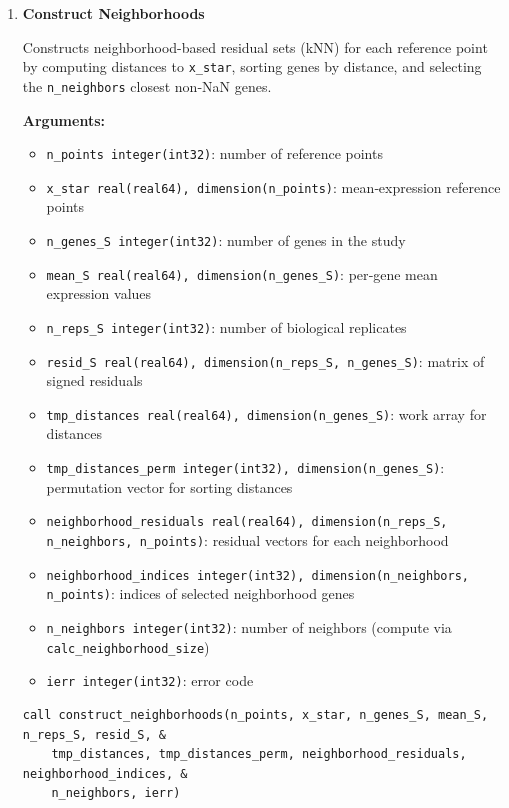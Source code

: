 \begin{enumerate}
    \item \textbf{Construct Neighborhoods}

        Constructs neighborhood-based residual sets (kNN) for each reference point by computing distances to \lstinline!x_star!, sorting genes by distance, and selecting the \lstinline!n_neighbors! closest non‑NaN genes.

        \textbf{Arguments:}
        \begin{itemize}
            \item \lstinline!n_points integer(int32)!: number of reference points
            \item \lstinline!x_star real(real64), dimension(n_points)!: mean‑expression reference points
            \item \lstinline!n_genes_S integer(int32)!: number of genes in the study
            \item \lstinline!mean_S real(real64), dimension(n_genes_S)!: per‑gene mean expression values
            \item \lstinline!n_reps_S integer(int32)!: number of biological replicates
            \item \lstinline!resid_S real(real64), dimension(n_reps_S, n_genes_S)!: matrix of signed residuals
            \item \lstinline!tmp_distances real(real64), dimension(n_genes_S)!: work array for distances
            \item \lstinline!tmp_distances_perm integer(int32), dimension(n_genes_S)!: permutation vector for sorting distances
            \item \lstinline!neighborhood_residuals real(real64), dimension(n_reps_S, n_neighbors, n_points)!: residual vectors for each neighborhood
            \item \lstinline!neighborhood_indices integer(int32), dimension(n_neighbors, n_points)!: indices of selected neighborhood genes
            \item \lstinline!n_neighbors integer(int32)!: number of neighbors (compute via \lstinline!calc_neighborhood_size!)
            \item \lstinline!ierr integer(int32)!: error code
        \end{itemize}

        \begin{lstlisting}[caption={Construct Neighborhoods}]
call construct_neighborhoods(n_points, x_star, n_genes_S, mean_S, n_reps_S, resid_S, &
    tmp_distances, tmp_distances_perm, neighborhood_residuals, neighborhood_indices, &
    n_neighbors, ierr)
        \end{lstlisting}


\end{enumerate}
